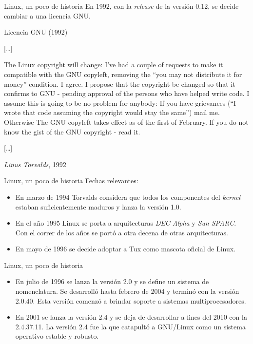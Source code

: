 \begin{frame}{Linux, un poco de historia}
  \small En 1992, con la \textit{release} de la versión 0.12, se decide
  cambiar a una licencia GNU.

\begin{block}{Licencia GNU \hfill (1992)}
  {\small

  [\ldots]

  The Linux copyright will change: I've had a couple of requests to make it
  compatible with the GNU copyleft, removing the ``you may not distribute
  it for money'' condition.  I agree.  I propose that the copyright be
  changed so that it confirms to GNU - pending approval of the persons who
  have helped write code.  I assume this is going to be no problem for
  anybody: If you have grievances (``I wrote that code assuming the
  copyright would stay the same'') mail me.  Otherwise The GNU copyleft
  takes effect as of the first of February.  If you do not know the gist of
  the GNU copyright - read it.

  [\ldots]

  }

  \hfill \emph{Linus Torvalds}, 1992 \cite{Torvalds1992-2}
\end{block}
\end{frame}

\begin{frame}{Linux, un poco de historia}
Fechas relevantes:
\begin{itemize}
\item En marzo de 1994 Torvalds considera que todos los componentes del
  \textit{kernel} estaban suficientemente maduros y lanza la versión 1.0.

\item En el año 1995 Linux se porta a arquitecturas \textit{DEC Alpha} y
  \textit{Sun SPARC}. Con el correr de los años se portó a otra decena de
  otras arquitecturas.

\item En mayo de 1996 se decide adoptar a Tux como mascota oficial de
  Linux.
\end{itemize}
\end{frame}

\begin{frame}{Linux, un poco de historia}
  \begin{itemize}
\item En julio de 1996 se lanza la versión 2.0 y se define un sistema de
  nomenclatura. Se desarrolló hasta febrero de 2004 y terminó con la
  versión 2.0.40. Esta versión comenzó a brindar soporte a sistemas
  multiprocesadores.

\item En 2001 se lanza la versión 2.4 y se deja de desarrollar a fines del
  2010 con la 2.4.37.11. La versión 2.4 fue la que catapultó a GNU/Linux
  como un sistema operativo estable y robusto.
\end{itemize}
\end{frame}

